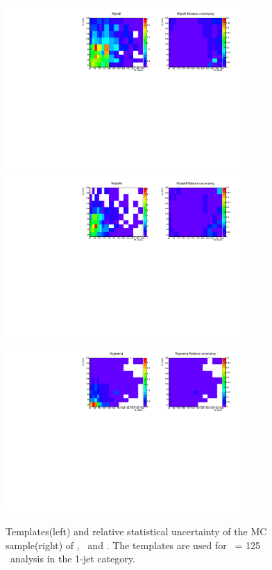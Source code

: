 \begin{figure}[htp]
\centering
\includegraphics[width=0.8\textwidth]{figures/2dtemplate_WjetsE_mH125_1j.pdf}
\includegraphics[width=0.8\textwidth]{figures/2dtemplate_WjetsM_mH125_1j.pdf}
\includegraphics[width=0.8\textwidth]{figures/2dtemplate_Wgamma_mH125_1j.pdf}
\caption{Templates(left) and relative statistical uncertainty of the MC sample(right) 
of \WjetsE, \WjetsM\ and \wgamma. 
The templates are used for \mHi\ = 125 \GeV\ analysis in the 1-jet category.}
\label{fig:2dtemplate_125_1j_3}
\end{figure}

